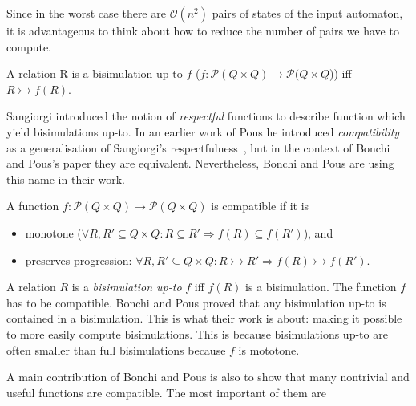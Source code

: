 Since in the worst case there are $\mathcal{O}(n^2)$ pairs of states of the
  input automaton, it is advantageous to think about how to reduce the number of
  pairs we have to compute.

\begin{definition}
A relation R is a bisimulation up-to $f$
($f : \mathcal{P}(Q \times Q) \to \mathcal{P}(Q \times Q$)) iff $R \rightarrowtail f(R)$.
\end{definition}

Sangiorgi introduced the notion of \emph{respectful} functions to describe
  function which yield bisimulations up-to.
In an earlier work of Pous he introduced \emph{compatibility} as a generalisation of
  Sangiorgi's respectfulness~\cite{pous2007complete}, but in the context of Bonchi and Pous's paper they
  are equivalent.
Nevertheless, Bonchi and Pous are using this name in their work.

\begin{definition}
  A function $f : \mathcal{P}(Q \times Q) \to \mathcal{P}(Q \times Q)$ is compatible if it is
  \begin{itemize}
    \item monotone ($\forall R, R' \subseteq Q \times Q: R \subseteq R' \Rightarrow f(R) \subseteq f(R')$), and
    \item preserves progression:
        $\forall R, R' \subseteq Q \times Q: R \rightarrowtail R' \Rightarrow f(R) \rightarrowtail f(R')$.
  \end{itemize}
\end{definition}

A relation $R$ is a \emph{bisimulation up-to} $f$ iff $f(R)$ is a bisimulation.
The function $f$ has to be compatible. Bonchi and Pous proved that
  any bisimulation up-to is contained in a bisimulation.
This is what their work is about:
  making it possible to more easily compute bisimulations.
This is because bisimulations up-to are often smaller than full bisimulations
  because $f$ is mototone.

A main contribution of Bonchi and Pous is also to show that many nontrivial
  and useful functions are compatible.
The most important of them are

